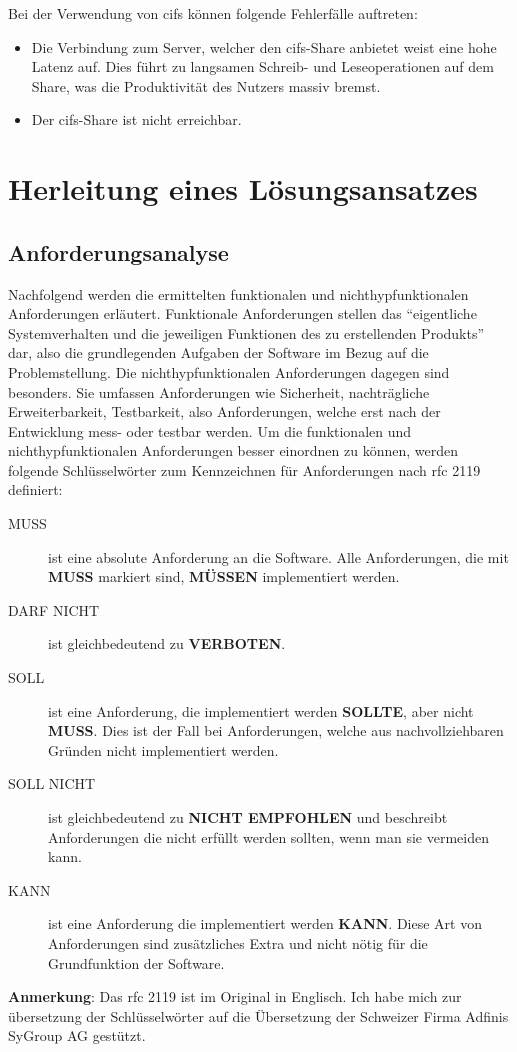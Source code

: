 \documentclass[titlepage]{report}
\begin{document}
Bei der Verwendung von \gls{cifs} können folgende Fehlerfälle auftreten:
\begin{itemize}
    \item Die Verbindung zum Server, welcher den \gls{cifs}\hyp{}Share
          anbietet weist eine hohe Latenz auf. Dies führt zu langsamen
          Schreib\hyp{} und Leseoperationen auf dem Share, was die
          Produktivität des Nutzers massiv bremst.
    \item Der \gls{cifs}\hyp{}Share ist nicht erreichbar.
\end{itemize}
\chapter*{Herleitung eines Lösungsansatzes}
\section*{Anforderungsanalyse}
Nachfolgend werden die ermittelten funktionalen und nichthyp{}funktionalen
Anforderungen erläutert. Funktionale Anforderungen stellen das
``eigentliche Systemverhalten und die jeweiligen Funktionen des zu
erstellenden Produkts''\cite[S. 20]{BPSE} dar, also die grundlegenden
Aufgaben der Software im Bezug auf die Problemstellung. Die
nichthyp{}funktionalen Anforderungen dagegen sind besonders. Sie umfassen
Anforderungen wie Sicherheit, nachträgliche Erweiterbarkeit,
Testbarkeit, also Anforderungen, welche erst nach der Entwicklung
mess\hyp{} oder testbar werden\cite[S. 292]{SNFA}. Um die funktionalen
und nichthyp{}funktionalen Anforderungen besser einordnen zu können, werden
folgende Schlüsselwörter zum Kennzeichnen für Anforderungen nach
\gls{rfc} 2119\cite{RFC2119} definiert:
\begin{description}
    \item[MUSS] ist eine absolute Anforderung an die Software. Alle
        Anforderungen, die mit \textbf{MUSS} markiert sind,
        \textbf{MÜSSEN} implementiert werden.
    \item[DARF NICHT] ist gleichbedeutend zu \textbf{VERBOTEN}.
    \item[SOLL] ist eine Anforderung, die implementiert werden
        \textbf{SOLLTE}, aber nicht \textbf{MUSS}. Dies ist der Fall bei
        Anforderungen, welche aus nachvollziehbaren Gründen nicht
        implementiert werden.
    \item[SOLL NICHT] ist gleichbedeutend zu \textbf{NICHT EMPFOHLEN}
        und beschreibt Anforderungen die nicht erfüllt werden sollten,
        wenn man sie vermeiden kann.
    \item[KANN] ist eine Anforderung die implementiert werden
        \textbf{KANN}. Diese Art von Anforderungen sind
        zusätzliches Extra und nicht nötig für die Grundfunktion der
        Software.
\end{description}
\textbf{Anmerkung}: Das \gls{rfc} 2119 ist im Original in Englisch. Ich
habe mich zur übersetzung der Schlüsselwörter auf die Übersetzung der
Schweizer Firma Adfinis SyGroup AG gestützt\cite{RFC2119DE}.
\end{document}
